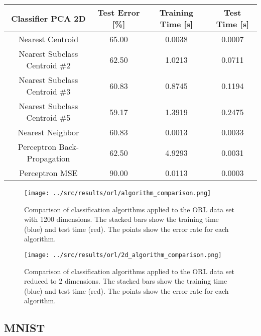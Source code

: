         \begin{table}[H]
            \small
            \begin{tabulary}{\linewidth}{CCCC}
        \toprule
        \textbf{Classifier PCA 2D}& \textbf{Test Error [\%]} & \textbf{Training Time [s]} & \textbf{Test Time [s]}  \\
        \midrule
        Nearest Centroid  & 65.00 & 0.0038 & 0.0007  \\ \hline
        Nearest Subclass Centroid \#2 &  62.50 & 1.0213 & 0.0711   \\ \hline
        Nearest Subclass Centroid \#3 & 60.83 & 0.8745 & 0.1194   \\ \hline 
        Nearest Subclass Centroid \#5 & 59.17 & 1.3919 & 0.2475   \\ \hline 
        Nearest Neighbor & 60.83 & 0.0013 & 0.0033  \\ \hline 
        Perceptron Back-Propagation & 62.50 & 4.9293 &  0.0031   \\ \hline 
        Perceptron MSE & 90.00 & 0.0113 & 0.0003 \\ 
        \bottomrule
        \end{tabulary}
        \caption{}
        \label{tab:orl_2d}
    \end{table}

\begin{figure}[H]
    \texttt{[image: ../src/results/orl/algorithm\_comparison.png]}
    \caption{Comparison of classification algorithms applied to the ORL data set with 1200 dimensions. The stacked bars show the training time (blue) and test time (red). The points show the error rate for each algorithm.}
    \label{fig:comparison_orl_1200d}
\end{figure}

\begin{figure}[H]
    \texttt{[image: ../src/results/orl/2d\_algorithm\_comparison.png]}
    \caption{Comparison of classification algorithms applied to the ORL data set reduced to 2 dimensions. The stacked bars show the training time (blue) and test time (red). The points show the error rate for each algorithm.}
    \label{fig:comparison_orl_2d}
\end{figure}

\subsection{MNIST}

